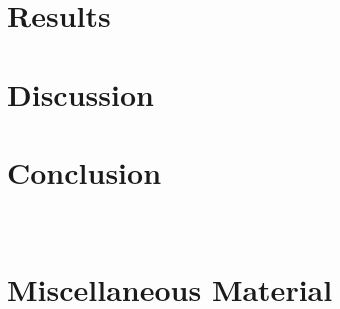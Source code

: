 \documentclass[nofootinbib,reprint,english]{revtex4-1}
\begin{document}
\section{Results}


\section{Discussion}

\section{Conclusion}

%
%


~
\clearpage
\appendix

\onecolumngrid
\section{Miscellaneous Material}\label{app:misc_material}
\end{document}
